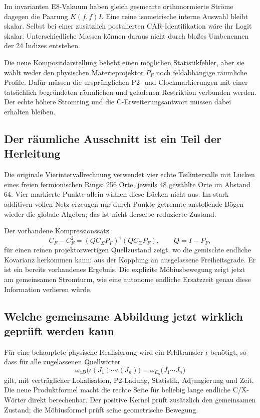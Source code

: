 Im invarianten E8-Vakuum haben gleich gesmearte orthonormierte Ströme dagegen die Paarung $K(f,f)I$. Eine reine isometrische interne Auswahl bleibt skalar. Selbst bei einer zusätzlich postulierten CAR-Identifikation wäre ihr Logit skalar. Unterschiedliche Massen können daraus nicht durch bloßes Umbenennen der 24 Indizes entstehen.

Die neue Kompositdarstellung behebt einen möglichen Statistikfehler, aber sie wählt weder den physischen Materieprojektor $P_F$ noch feldabhängige räumliche Profile. Dafür müssen die ursprünglichen P2- und Clockmarkierungen mit einer tatsächlich begründeten räumlichen und geladenen Restriktion verbunden werden. Der echte höhere Stromring und die C-Erweiterungsantwort müssen dabei erhalten bleiben.

\subsection{Der räumliche Ausschnitt ist ein Teil der Herleitung}
Die originale Vierintervallrechnung  verwendet vier echte Teilintervalle mit Lücken eines freien fermionischen Rings: 256 Orte, jeweils 48 gewählte Orte im Abstand 64. Vier markierte Punkte allein wählen diese Lücken nicht aus. Im stark additiven vollen Netz erzeugen nur durch Punkte getrennte anstoßende Bögen wieder die globale Algebra; das ist nicht derselbe reduzierte Zustand.

Der vorhandene Kompressionssatz
\begin{equation}
C_F-C_F^2=(QC_\Sigma P_F)^\dagger(QC_\Sigma P_F),\qquad Q=I-P_F,
\end{equation}
für einen reinen projektorwertigen Quellzustand zeigt, wo die gemischte endliche Kovarianz herkommen kann: aus der Kopplung an ausgelassene Freiheitsgrade. Er ist ein bereits vorhandenes Ergebnis. Die explizite Möbiusbewegung zeigt jetzt am gemeinsamen Stromturm, wie eine autonome endliche Ersatzzeit genau diese Information verlieren würde.

\subsection{Welche gemeinsame Abbildung jetzt wirklich geprüft werden kann}
Für eine behauptete physische Realisierung wird ein Feldtransfer $\iota$ benötigt, so dass für alle zugelassenen Quellwörter
\begin{equation}
\omega_{4D}\bigl(\iota(J_1)\cdots\iota(J_n)\bigr)
=\omega_{E_8}\bigl(J_1\cdots J_n\bigr)
\end{equation}
gilt, mit verträglicher Lokalisation, P2-Ladung, Statistik, Adjungierung und Zeit. Die neue Produktformel macht die rechte Seite für beliebig lange endliche C/X-Wörter direkt berechenbar. Der positive Kernel prüft zusätzlich den gemeinsamen Zustand; die Möbiusformel prüft seine geometrische Bewegung.

